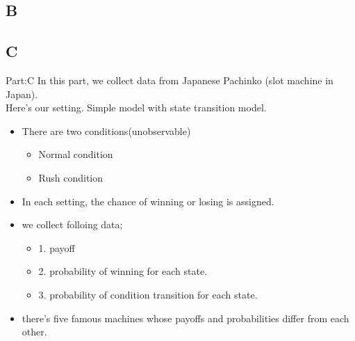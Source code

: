 \documentclass{beamer}
\begin{document}
\subsection{B}


\subsection{C}
\begin{frame}{Part:C}
In this part, we collect data from Japanese Pachinko (slot machine in Japan).\\
Here's our setting. Simple model with state transition model.
\begin{itemize}
    \item There are two conditions(unobservable)
    \begin{itemize}
        \item Normal condition
        \item Rush condition
    \end{itemize}
    \item In each setting, the chance of winning or losing is assigned.
\end{itemize}
\begin{itemize}
    \item we collect folloing data; 
    \begin{itemize}
        \item 1. payoff
        \item 2. probability of winning for each state.
        \item 3. probability of condition transition for each state.
    \end{itemize}
    \item there's five famous machines whose payoffs and probabilities differ from each other.
\end{itemize}
\end{frame}
\end{document}
